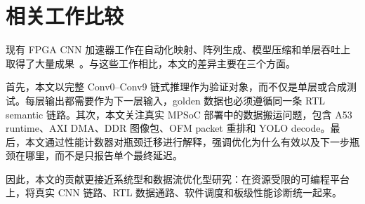 \section{相关工作比较}

现有 FPGA CNN 加速器工作在自动化映射、阵列生成、模型压缩和单层吞吐上取得了大量成果~\cite{qiu2016going,guo2019angeleye,wei2017s2a,ma2018rtlcompiler,ding2022tinyyolo}。与这些工作相比，本文的差异主要在三个方面。

首先，本文以完整 Conv0--Conv9 链式推理作为验证对象，而不仅是单层或合成测试。每层输出都需要作为下一层输入，golden 数据也必须遵循同一条 RTL semantic 链路。其次，本文关注真实 MPSoC 部署中的数据搬运问题，包含 A53 runtime、AXI DMA、DDR 图像包、OFM packet 重排和 YOLO decode。最后，本文通过性能计数器对瓶颈迁移进行解释，强调优化为什么有效以及下一步瓶颈在哪里，而不是只报告单个最终延迟。

因此，本文的贡献更接近系统型和数据流优化型研究：在资源受限的可编程平台上，将真实 CNN 链路、RTL 数据通路、软件调度和板级性能诊断统一起来。
